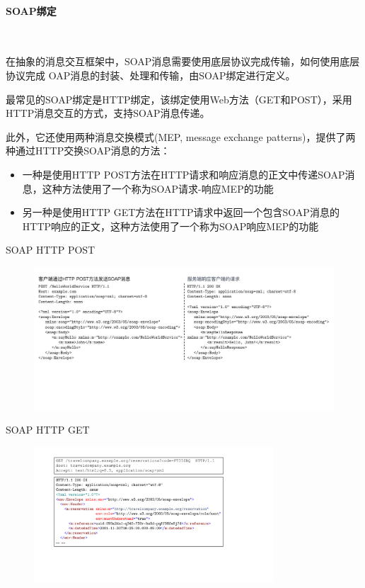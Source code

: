 \paragraph*{SOAP绑定}~{} \par
在抽象的消息交互框架中，SOAP消息需要使用底层协议完成传输，如何使用底层协议完成 OAP消息的封装、处理和传输，由SOAP绑定进行定义。

最常见的SOAP绑定是HTTP绑定，该绑定使用Web方法（GET和POST），采用HTTP消息交互的方式，支持SOAP消息传递。

此外，它还使用两种消息交换模式(MEP, message exchange patterns)，提供了两种通过HTTP交换SOAP消息的方法：
\begin{itemize}
    \item 一种是使用HTTP POST方法在HTTP请求和响应消息的正文中传递SOAP消息，这种方法使用了一个称为SOAP请求-响应MEP的功能
    \item 另一种是使用HTTP GET方法在HTTP请求中返回一个包含SOAP消息的HTTP响应的正文，这种方法使用了一个称为SOAP响应MEP的功能
\end{itemize}

SOAP HTTP POST
\begin{figure}[H]
    \vspace{-0.5em}
	\centering
	\includegraphics[width=\textwidth]{images/SOAP绑定POST.pdf}
    \vspace{-3em}
\end{figure}

SOAP HTTP GET
\begin{figure}[H]
    \vspace{-0.5em}
	\centering
	\includegraphics[width=0.8\textwidth]{images/SOAP绑定get.pdf}
    \vspace{-1.5em}
\end{figure}


